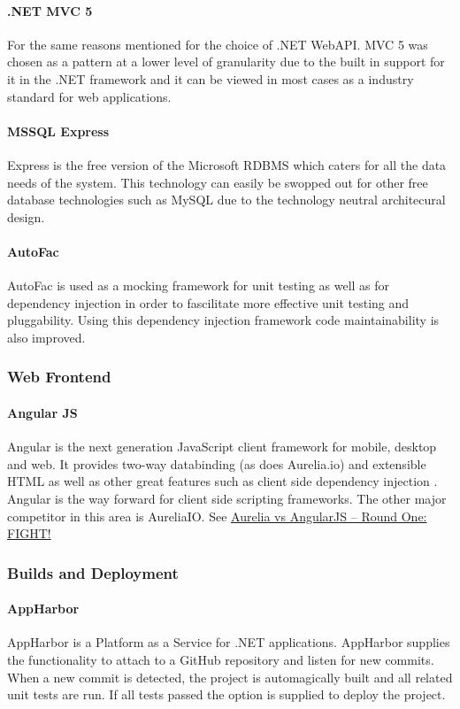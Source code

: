 \documentclass[11pt,a4paper,titlepage]{article}
\begin{document}
			\paragraph{.NET MVC 5}
				For the same reasons mentioned for the choice of .NET WebAPI. MVC 5 was chosen as a pattern at a lower level of granularity due to the built in support for it in the .NET framework and it can be viewed in most cases as a industry standard for web applications.
			\paragraph{MSSQL Express}
					Express is the free version of the Microsoft RDBMS which caters for all the data needs of the system. This technology can easily be swopped out for other free database technologies such as MySQL
					due to the technology neutral architecural design.
			\paragraph{AutoFac}
					AutoFac is used as a mocking framework for unit testing as well as for dependency injection in order to fascilitate more effective unit testing and pluggability. Using this dependency injection framework code maintainability is also improved.
		\subsubsection{Web Frontend}
			\paragraph{Angular JS}
				Angular is the next generation JavaScript client framework for mobile, desktop and web. It provides two-way databinding (as does Aurelia.io) and extensible HTML as well as other great features such as client side dependency injection
				. Angular is the way forward for client side scripting frameworks. The other major competitor in this area is AureliaIO. See \href{http://ilikekillnerds.com/2015/01/aurelia-vs-angularjs-round-one-fight/}{Aurelia vs AngularJS – Round One: FIGHT!}
		\subsubsection{Builds and Deployment}		
			\paragraph{AppHarbor}
				AppHarbor is a Platform as a Service for .NET applications. AppHarbor supplies the functionality to attach to a GitHub repository and listen for new commits. When a new commit is detected, the project is automagically built and all related unit tests are run. If all tests passed the option is supplied to deploy the project.
\end{document}
